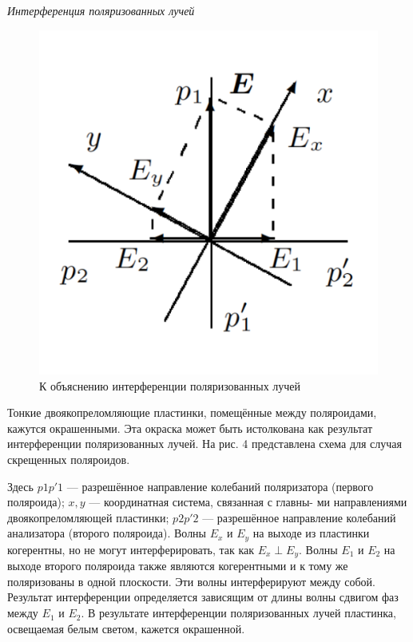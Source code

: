 \documentclass[a4paper, 12pt]{article}%
\begin{document}
	\textit{Интерференция поляризованных лучей}\\
	
	\begin{figure}
		\includegraphics[width=\linewidth]{4}
		\caption{К объяснению интерференции
			поляризованных лучей}
		\label{ris 4}
	\end{figure}
	
	
	Тонкие двоякопреломляющие пластинки, помещённые между поляроидами, кажутся окрашенными. Эта окраска может быть истолкована как результат интерференции поляризованных лучей. На рис. 4 представлена схема для
	случая скрещенных поляроидов.
	
	Здесь $ p1p'1 $ --- разрешённое направление колебаний поляризатора
	(первого поляроида); $ x, y $ --- координатная система, связанная с главны-
	ми направлениями двоякопреломляющей пластинки; $ p2p'2 $ --- разрешённое направление колебаний анализатора (второго поляроида). Волны
	$ E_x  $ и $ E_y $ на выходе из пластинки когерентны, но не могут интерферировать, так как $ E_x \perp  E_y $. Волны $ E_1 $ и $ E_2 $ на выходе второго поляроида
	также являются когерентными и к тому же поляризованы в одной плоскости. Эти волны интерферируют между собой. Результат интерференции определяется зависящим от длины волны сдвигом фаз между $ E_1 $
	и $ E_2 $. В результате интерференции поляризованных лучей пластинка, освещаемая белым светом, кажется окрашенной.
	
\end{document}
